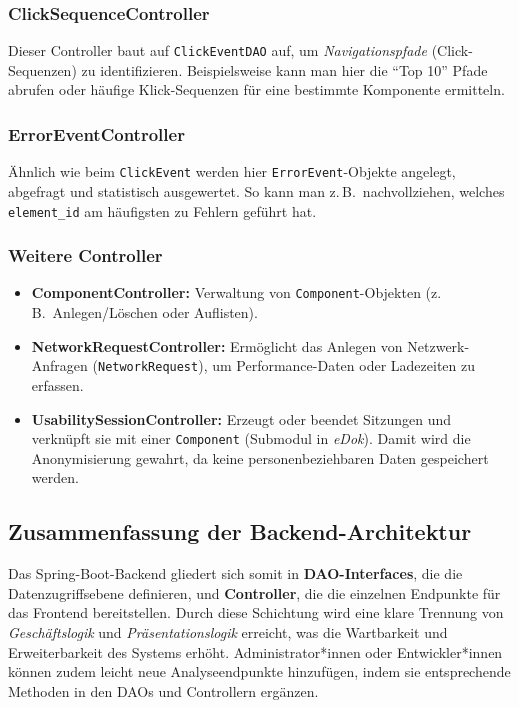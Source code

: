\documentclass[12pt,oneside]{article}
\begin{document}
\subsubsection{ClickSequenceController}
Dieser Controller baut auf \lstinline|ClickEventDAO| auf, um \emph{Navigationspfade} (Click-Sequenzen) zu identifizieren. Beispielsweise kann man hier die \enquote{Top 10} Pfade abrufen oder häufige Klick-Sequenzen für eine bestimmte Komponente ermitteln.

\subsubsection{ErrorEventController}
Ähnlich wie beim \lstinline|ClickEvent| werden hier \lstinline|ErrorEvent|-Objekte angelegt, abgefragt und statistisch ausgewertet. So kann man z.\,B.\ nachvollziehen, welches \lstinline|element_id| am häufigsten zu Fehlern geführt hat.

\subsubsection{Weitere Controller}
\begin{itemize}
    \item \textbf{ComponentController:} Verwaltung von \lstinline|Component|-Objekten (z.\,B.\ Anlegen/Löschen oder Auflisten).
    \item \textbf{NetworkRequestController:} Ermöglicht das Anlegen von Netzwerk-Anfragen (\lstinline|NetworkRequest|), um Performance-Daten oder Ladezeiten zu erfassen.
    \item \textbf{UsabilitySessionController:} Erzeugt oder beendet Sitzungen und verknüpft sie mit einer \lstinline|Component| (Submodul in \textit{eDok}). Damit wird die Anonymisierung gewahrt, da keine personenbeziehbaren Daten gespeichert werden.
\end{itemize}

\subsection{Zusammenfassung der Backend-Architektur}
Das Spring-Boot-Backend gliedert sich somit in \textbf{DAO-Interfaces}, die die Datenzugriffsebene definieren, und \textbf{Controller}, die die einzelnen Endpunkte für das Frontend bereitstellen. Durch diese Schichtung wird eine klare Trennung von \emph{Geschäftslogik} und \emph{Präsentationslogik} erreicht, was die Wartbarkeit und Erweiterbarkeit des Systems erhöht. Administrator*innen oder Entwickler*innen können zudem leicht neue Analyseendpunkte hinzufügen, indem sie entsprechende Methoden in den DAOs und Controllern ergänzen. 
\end{document}
